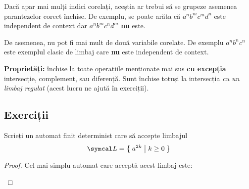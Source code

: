 Dacă apar mai mulți indici corelați, aceștia ar trebui să se grupeze asemenea parantezelor corect închise. De exemplu, se poate arăta că \(a^n b^m c^m d^n\) este independent de context dar \(a^n b^m c^n d^m\) \textbf{nu} este.

De asemenea, nu pot fi mai mult de două variabile corelate. De exemplu \(a^n b^n c^n\) este exemplul clasic de limbaj care \textbf{nu} este independent de context.

\textbf{Proprietăți:} închise la toate operațiile menționate mai sus \textbf{cu excepția} intersecție, complement, sau diferență. Sunt închise totuși la intersecția \emph{cu un limbaj regulat} (acest lucru ne ajută în exerciții).

\subsection*{Exerciții}

\begin{exercise}
    Scrieți un automat finit determinist care să accepte limbajul
    \[\lang = \Set{ a^{2k} | k \geq 0 }\]
\end{exercise}
\begin{proof}
    Cel mai simplu automat care acceptă acest limbaj este:
    \begin{figure}[H]
        \centering
    \end{figure}
\end{proof}

